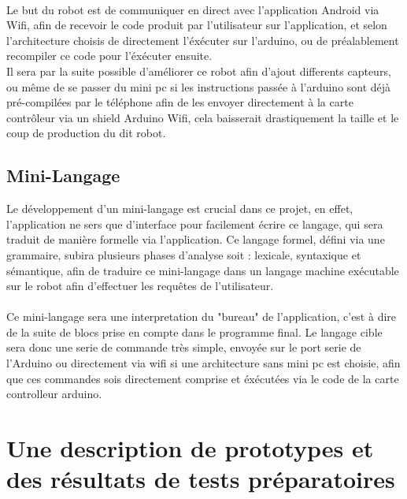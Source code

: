 \documentclass[a4paper]{article}
\begin{document}
\paragraph{}
Le but du robot est de communiquer en direct avec l'application Android via Wifi, afin de recevoir le code produit par l'utilisateur sur l'application, et selon l'architecture choisis de directement l'éxécuter sur l'arduino, ou de préalablement recompiler ce code pour l'éxécuter ensuite.\\
Il sera par la suite possible d'améliorer ce robot afin d'ajout differents capteurs, ou même de se passer du mini pc si les instructions passée à l'arduino sont déjà pré-compilées par le téléphone afin de les envoyer directement à la carte contrôleur via un shield Arduino Wifi, cela baisserait drastiquement la taille et le coup de production du dit robot.

\subsection{Mini-Langage}

Le développement d’un mini-langage est crucial dans ce projet, en effet, l’application ne sers que d’interface pour facilement écrire ce langage, qui sera traduit de manière formelle via l’application. Ce langage formel, défini via une grammaire, subira plusieurs phases d’analyse soit : lexicale, syntaxique et sémantique, afin de traduire ce mini-langage dans un langage machine exécutable sur le robot afin d’effectuer les requêtes de l’utilisateur.

\paragraph{}
Ce mini-langage sera une interpretation du "bureau" de l'application, c'est à dire de la suite de blocs prise en compte dans le programme final. Le langage cible sera donc une serie de commande très simple, envoyée sur le port serie de l'Arduino ou directement via wifi si une architecture sans mini pc est choisie, afin que ces commandes sois directement comprise et éxécutées via le code de la carte controlleur arduino.

\section{Une description de prototypes et des résultats de tests préparatoires}
\end{document}
